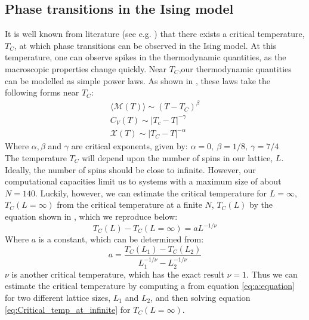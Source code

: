 \documentclass[a4paper, 10pt]{article}
\begin{document}
\subsection{Phase transitions in the Ising model}\label{phase_tranisition}
It is well known from literature (see e.g. \cite{Tc}) that there exists a critical temperature, $T_C$, at which phase transitions can be observed in the Ising model. At this temperature, one can observe spikes in the thermodynamic quantities, as the macroscopic properties change quickly. Near $T_C$,our thermodynamic quantities can be modelled as simple power laws. As shown in \cite{Project}, these laws take the following forms near $T_C$:
\begin{equation}\label{eq:analytical_thermo_near_critical}
\begin{split}
\langle \mathcal{M}(T)\rangle \sim (T-T_C)^{\beta}\\
C_V(T) \sim |T_c-T|^{-\gamma}\\
\mathcal{X}(T) \sim |T_C-T|^{-\alpha}
\end{split}
\end{equation}
Where $\alpha, \beta$ and $\gamma$ are critical exponents, given by: $\alpha=0,\  \beta=1/8,\ \gamma=7/4$\\
\linebreak
The temperature $T_C$ will depend upon the number of spins in our lattice, $L$. Ideally, the number of spins should be close to infinite. However, our computational capacities limit us to systems with a maximum size of about $N=140$. Luckily, however, we can estimate the critical temperature for $L=\infty$, $T_C(L=\infty)$ from the critical temperature at a finite $N$, $T_C(L)$ by the equation shown in \cite{Project}, which we reproduce below:
\begin{equation}\label{eq:Critical_temp_at_infinite}
T_C(L)-T_C(L=\infty)=aL^{-1/\nu}
\end{equation}
Where $a$ is a constant, which can be determined from:
\begin{equation}\label{eq:a:equation}
a=\frac{T_C(L_1)-T_C(L_2)}{L_1^{-1/\nu}-L_2^{-1/\nu}}
\end{equation}
$\nu$ is another critical temperature, which has the exact result $\nu=1$. Thus we can estimate the critical temperature by computing a from equation \ref{eq:a:equation} for two different lattice sizes, $L_1$ and $L_2$, and then solving equation \ref{eq:Critical_temp_at_infinite} for $T_C(L=\infty)$.
\end{document}
